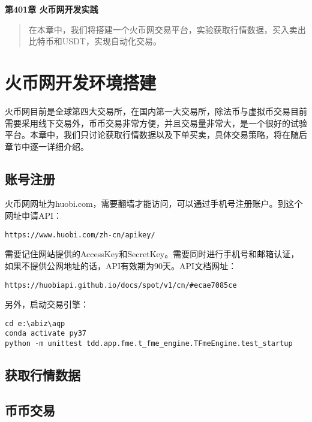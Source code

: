 \newpage
\maketitle
\begin{center}
\Large \textbf{第401章 火币网开发实践} \quad 
\end{center}
\begin{abstract}
在本章中，我们将搭建一个火币网交易平台，实验获取行情数据，买入卖出比特币和USDT，实现自动化交易。
\end{abstract}
\section{火币网开发环境搭建}
火币网目前是全球第四大交易所，在国内第一大交易所，除法币与虚拟币交易目前需要采用线下交易外，币币交易非常方便，并且交易量非常大，是一个很好的试验平台。本章中，我们只讨论获取行情数据以及下单买卖，具体交易策略，将在随后章节中逐一详细介绍。
\subsection{账号注册}
火币网网址为huobi.com，需要翻墙才能访问，可以通过手机号注册账户。到这个网址申请API：
\begin{lstlisting}
https://www.huobi.com/zh-cn/apikey/
\end{lstlisting}
需要记住网站提供的AccessKey和SecretKey。需要同时进行手机号和邮箱认证，如果不提供公网地址的话，API有效期为90天。API文档网址：
\begin{lstlisting}
https://huobiapi.github.io/docs/spot/v1/cn/#ecae7085ce
\end{lstlisting}
另外，启动交易引擎：
\begin{lstlisting}
cd e:\abiz\aqp
conda activate py37
python -m unittest tdd.app.fme.t_fme_engine.TFmeEngine.test_startup
\end{lstlisting}
\subsection{获取行情数据}
\subsection{币币交易}